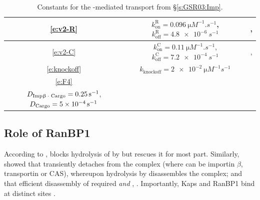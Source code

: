 \documentclass[12pt,notitlepage]{article}
\begin{document}
\begin{table}
\centering
\small
\begin{tabular}{c|c|c}
	\hline
	\eqref{e:v2-R}
	&
	$k_\text{on}^\text{R} = \SI{0.096}{\micro M^{-1} . s^{-1}}$,
	\;
	$k_\text{off}^\text{R} = \SI{4.8e-6}{s^{-1}}$
	&
	\cite[Supp.~Table~A]{GoerlichSeewaldRibbeck2003},
	\cite[Table II]{RiddickMacara2005}
	\\
	\hline
	\eqref{e:v2-C}
	&
	$k_\text{on}^\text{C} = \SI{0.11}{\micro M^{-1} . s^{-1}}$,
	\quad
	$k_\text{off}^\text{C} = \SI{7.2e-4}{s^{-1}}$
	&
	\cite[Table~I]{Catimel2001},
	\cite[Table~II]{RiddickMacara2005}
	\\
	\hline
	\eqref{e:knockoff}
	&
	$k_\text{knockoff} = \SI{2e-2}{\micro M^{-1} s^{-1}}$
	&
	\cite[Table II]{RiddickMacara2005}
	\\
	\hline
	\eqref{e:F4}
	&
	\makecell{
		$D_{\ce{Imp\beta . Ran . GTP}} = \SI{0.07}{s^{-1}}$, \quad
		$D_{\ce{Imp\beta}} = \SI{0.4}{s^{-1}}$
		\\
		$D_{\ce{Imp\beta . Cargo}} = \SI{0.25}{s^{-1}}$, \;	
		$D_{\ce{Cargo}} = \SI{5e-4}{s^{-1}}$
	}
	&
	\cite[Table III]{RiddickMacara2005}
	\\
	\hline
\end{tabular}
%
\caption{%
	Constants for the -mediated
	transport from \S\ref{s:GSR03:Imp}.
}
%
\label{t:GSR-ImpB-const}
\end{table}







\subsection{Role of RanBP1} \label{ss:ranbp1}

According to 
\cite[\href{https://i.ibb.co/6ghqPB7/image.jpg}{Fig.~4A}]{LounsburyMacara1997},
 blocks hydrolysis of  by 
but 
 rescues it for most part.
%
Similarly,
\cite{BischoffGoerlich1997}
showed that
 transiently detaches  
from the complex 
(where  can be importin $\beta$, transportin or CAS),
whereupon hydrolysis by  
disassembles the complex;
and
that efficient disassembly 
of  required  \emph{and} 
\cite[\S3.2, cf.~\href{https://i.ibb.co/PZKRSJ0/image.jpg}{Fig.~4}]{BischoffGoerlich1997},
\cite{FloerBlobelRexach1997}.
%
%
Importantly,
Kaps and RanBP1
bind 
at distinct sites
\cite[p.253]{BischoffGoerlich1997}.
\end{document}
